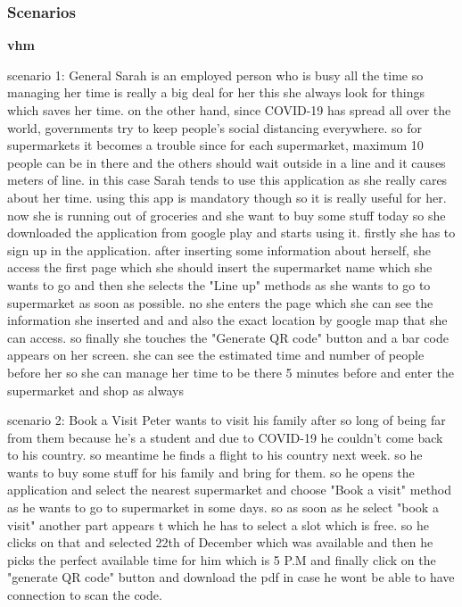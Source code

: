 \subsubsection{Scenarios}
\begin{SC}
    \item \bfseries vhm
\end{SC}
scenario 1: General
Sarah is an employed person who is busy all the time so managing her time is really a big deal for her this she always look for things which saves her time. on the other hand, since COVID-19 has spread all over the world, governments try to keep people's social distancing everywhere. so for supermarkets it becomes a trouble since for each supermarket, maximum 10 people can be in there and the others should wait outside in a line and it causes meters of line. in this case Sarah tends to use this application as she really cares about her time. using this app is mandatory though so it is really useful for her.
now she is running out of groceries and she want to buy some stuff today so she downloaded the application from google play and starts using it. firstly she has to sign up in the application. after inserting some information about herself, she access the first page which she should insert the supermarket name which she wants to go and then she selects the "Line up" methods as she wants to go to supermarket as soon as possible.
no she enters the page which she can see the information she inserted and and also the exact location by google map that she can access. so finally she touches the "Generate QR code" button and a bar code appears on her screen.
she can see the estimated time and number of people before her so she can manage her time to be there 5 minutes before and enter the supermarket and shop as always

scenario 2: Book a Visit
Peter wants to visit his family after so long of being far from them because he's a student and due to COVID-19 he couldn't come back to his country. so meantime he finds a flight to his country next week. so he wants to buy some stuff for his family and bring for them. so he opens the application and select the nearest  supermarket and choose "Book a visit" method as he wants to go to supermarket in some days. so as soon as he select "book a visit" another part appears t which he has to select a slot which is free. so he clicks on that and selected 22th of December which was available and then he picks the perfect available time for him which is 5 P.M and finally click on the "generate QR code" button and download the pdf in case he wont be able to have connection to scan the code.


